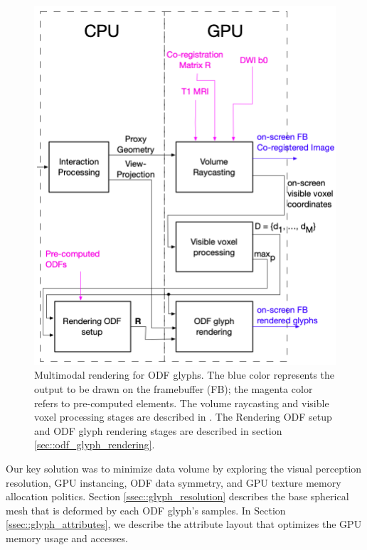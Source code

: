 \documentclass[twoside,twocolumn,10pt]{article}
\begin{document}
\begin{figure}[ht]
    \centering
    \includegraphics[width=1.0\linewidth, angle=0]{figs/rendering_scheme/fluxograma_glifosVMTK_5.png}
    \caption{Multimodal rendering for ODF glyphs. The blue color represents the output to be drawn on the framebuffer (FB); the magenta color refers to pre-computed elements. The volume raycasting and visible voxel processing stages are described in \cite{voltoline2021}. The Rendering ODF setup and ODF glyph rendering stages are described in section \ref{sec::odf_glyph_rendering}.}
    \label{fig::vmtk_simplified}
\end{figure}

Our key solution was to minimize data volume by exploring the visual perception resolution, GPU instancing, ODF data symmetry, and GPU texture memory allocation politics. Section \ref{ssec::glyph_resolution} describes the base spherical mesh that is deformed by each ODF glyph's samples. In Section \ref{ssec::glyph_attributes}, we describe the attribute layout that optimizes the GPU memory usage and accesses.

\end{document}
